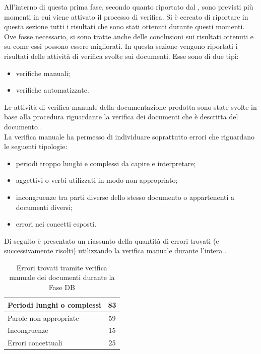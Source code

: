  \label{app:esiti}
	All'interno di questa prima fase, secondo quanto riportato dal , sono previsti più momenti in cui viene attivato il 
	processo di verifica. Si è cercato di riportare in questa sezione tutti i risultati che sono stati ottenuti durante questi momenti. Ove fosse 
	necessario, si sono tratte anche delle conclusioni sui risultati ottenuti e su come essi possono essere migliorati.
			In questa sezione vengono riportati i risultati delle attività di verifica svolte sui documenti. Esse sono di due tipi:
			\begin{itemize}
				\item verifiche manuali;
				\item verifiche automatizzate.
			\end{itemize}
				Le attività di verifica manuale della documentazione prodotta sono state svolte in base alla procedura riguardante la verifica dei 
				documenti che è descritta del documento .\\
				La verifica manuale ha permesso di individuare soprattutto errori che riguardano le seguenti tipologie:
				\begin{itemize}
					\item periodi troppo lunghi e complessi da capire e interpretare;
					\item aggettivi o verbi utilizzati in modo non appropriato;
					\item incongruenze tra parti diverse dello stesso documento o appartenenti a documenti diversi;
					\item errori nei concetti esposti.
				\end{itemize}
				Di seguito è presentato un riassunto della quantità di errori trovati (e successivamente risolti) utilizzando la verifica manuale durante 
				l'intera .
				\begin{table}[H]
					\centering
					\begin{tabu}{| l | c |}
						\hline
						Periodi lunghi o complessi	&83	\\ \hline
						Parole non appropriate	&59	\\ \hline
						Incongruenze	&15	\\ \hline
						Errori concettuali	&25	\\ \hline
					\end{tabu}
					\caption{Errori trovati tramite verifica manuale dei documenti durante la Fase DB}
				\end{table}

